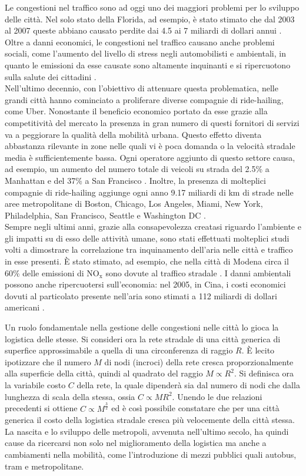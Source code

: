 \documentclass[../main.tex]{subfiles}
\begin{document}
Le congestioni nel traffico sono ad oggi uno dei maggiori problemi per lo sviluppo delle citt\`a.
Nel solo stato della Florida, ad esempio, \`e stato stimato che dal 2003 al 2007 queste abbiano causato perdite dai 4.5 ai 7 miliardi di dollari annui \cite{florida}.
Oltre a danni economici, le congestioni nel traffico causano anche problemi sociali, come l'aumento del livello di stress negli automobilisti \cite{hennessy1999traffic} e ambientali, in quanto le emissioni da esse causate sono altamente inquinanti e si ripercuotono sulla salute dei cittadini \cite{zhang2013air}.\\
Nell'ultimo decennio, con l'obiettivo di attenuare questa problematica, nelle grandi citt\`a hanno cominciato a proliferare diverse compagnie di ride-hailing, come Uber.
Nonostante il beneficio economico portato da esse grazie alla competitivit\`a del mercato la presenza in gran numero di questi fornitori di servizi va a peggiorare la qualit\`a della mobilit\`a urbana.
Questo effetto diventa abbastanza rilevante in zone nelle quali vi \`e poca domanda o la velocit\`a stradale media \`e sufficientemente bassa.
Ogni operatore aggiunto di questo settore causa, ad esempio, un aumento del numero totale di veicoli su strada del 2.5\% a Manhattan e del 37\% a San Francisco \cite{Kondor2022}.
Inoltre, la presenza di molteplici compagnie di ride-hailing aggiunge ogni anno 9.17 miliardi di km di strade nelle aree metropolitane di Boston, Chicago, Los Angeles, Miami, New York, Philadelphia, San Francisco, Seattle e Washington DC \cite{schaller2018new}.\\
Sempre negli ultimi anni, grazie alla consapevolezza creatasi riguardo l'ambiente e gli impatti su di esso delle attivit\`a umane, sono stati effettuati molteplici studi volti a dimostrare la correlazione tra inquinamento dell'aria nelle citt\`a e traffico in esse presenti.
\`E stato stimato, ad esempio, che nella citt\`a di Modena circa il 60\% delle emissioni di NO$_\text{x}$ sono dovute al traffico stradale \cite{veratti2017mu}.
I danni ambientali possono anche ripercuotersi sull'economia: nel 2005, in Cina, i costi economici dovuti al particolato presente nell'aria sono stimati a 112 miliardi di dollari americani \cite{MATUS201255}.

Un ruolo fondamentale nella gestione delle congestioni nelle citt\`a lo gioca la logistica delle stesse.
Si consideri ora la rete stradale di una citt\`a generica di superfice approssimabile a quella di una circonferenza di raggio $R$.
\`E lecito ipotizzare che il numero $M$ di nodi (incroci) della rete cresca proporzionalmente alla superficie della citt\`a, quindi al quadrato del raggio $M\propto R^2$.
Si definisca ora la variabile costo $C$ della rete, la quale dipender\`a sia dal numero di nodi che dalla lunghezza di scala della stessa, ossia $C\propto MR^2$.
Unendo le due relazioni precedenti si ottiene $C\propto M^\frac{3}{2}$ ed \`e cos\`i possibile constatare che per una citt\`a generica il costo della logistica stradale cresca pi\`u velocemente della citt\`a stessa.
La nascita e lo sviluppo delle metropoli, avvenuta nell'ultimo secolo, ha quindi cause da ricercarsi non solo nel miglioramento della logistica ma anche a cambiamenti nella mobilit\`a, come l'introduzione di mezzi pubblici quali autobus, tram e metropolitane.
\end{document}
